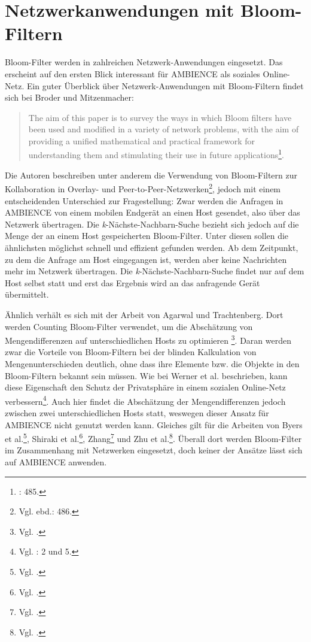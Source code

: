 \section{Netzwerkanwendungen mit Bloom-Filtern}\label{sec:bloom-netzwerk}
Bloom-Filter werden in zahlreichen Netzwerk-Anwendungen eingesetzt. Das erscheint auf den ersten Blick interessant für AMBIENCE als soziales Online-Netz. Ein guter Überblick über Netzwerk-Anwendungen mit Bloom-Filtern findet sich bei Broder und Mitzenmacher:  
\begin{quote}
The aim of this paper is to survey the ways in which Bloom filters have been used and modified in a variety of network problems, with the aim of providing a unified mathematical and practical framework for understanding them and stimulating their use in future applications\footnote{\cite{Broder2004}: 485.}.
\end{quote}
Die Autoren beschreiben unter anderem die Verwendung von Bloom-Filtern zur Kollaboration in Overlay- und Peer-to-Peer-Netzwerken\footnote{Vgl. ebd.: 486.}, jedoch mit einem entscheidenden Unterschied zur Fragestellung: Zwar werden die Anfragen in AMBIENCE von einem mobilen Endgerät an einen Host gesendet, also über das Netzwerk übertragen. Die \textit{k}-Nächste-Nachbarn-Suche bezieht sich jedoch auf die Menge der an einem Host gespeicherten Bloom-Filter. Unter diesen sollen die ähnlichsten möglichst schnell und effizient gefunden werden. Ab dem Zeitpunkt, zu dem die Anfrage am Host eingegangen ist, werden aber keine Nachrichten mehr im Netzwerk übertragen. Die \textit{k}-Nächste-Nachbarn-Suche findet nur auf dem Host selbst statt und erst das Ergebnis wird an das anfragende Gerät übermittelt. 

Ähnlich verhält es sich mit der Arbeit von Agarwal und Trachtenberg. Dort werden Counting Bloom-Filter verwendet, um die Abschätzung von Mengendifferenzen auf unterschiedlichen Hosts zu optimieren \footnote{Vgl. \cite{Agarwal2006}.}. Daran werden zwar die Vorteile von Bloom-Filtern bei der blinden Kalkulation von Mengenunterschieden deutlich, ohne dass ihre Elemente bzw. die Objekte in den Bloom-Filtern bekannt sein müssen. Wie bei Werner et al. beschrieben, kann diese Eigenschaft den Schutz der Privatsphäre in einem sozialen Online-Netz verbessern\footnote{Vgl. \cite{Werner2015}: 2 und 5.}. Auch hier findet die Abschätzung der Mengendifferenzen jedoch zwischen zwei unterschiedlichen Hosts statt, weswegen dieser Ansatz für AMBIENCE nicht genutzt werden kann. Gleiches gilt für die Arbeiten von Byers et al.\footnote{Vgl. \cite{Byers2002}.}, Shiraki et al.\footnote{Vgl. \cite{Shiraki2009}.}, Zhang\footnote{Vgl. \cite{Zhang2012}.} und Zhu et al.\footnote{Vgl. \cite{Zhu2004}.}. Überall dort werden Bloom-Filter im Zusammenhang mit Netzwerken eingesetzt, doch keiner der Ansätze lässt sich auf AMBIENCE anwenden. 
